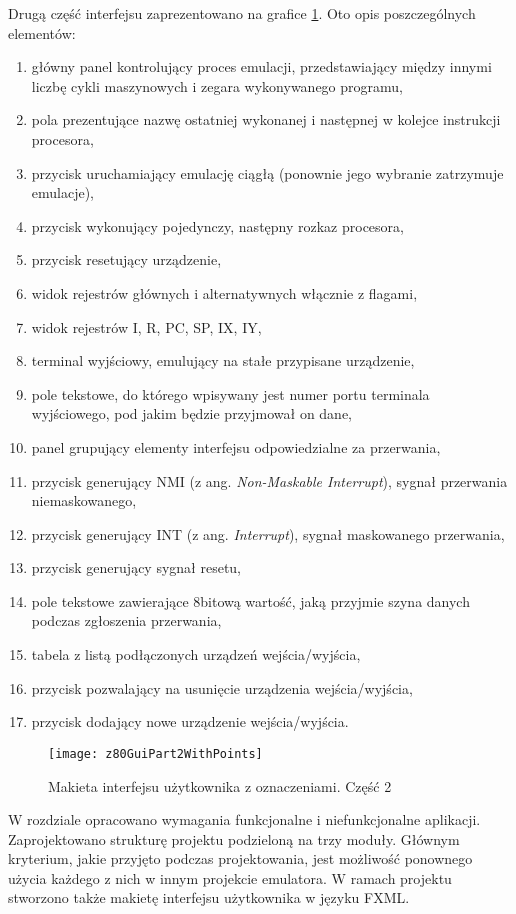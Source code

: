	Drugą część interfejsu zaprezentowano na grafice \ref{img:z80GuiPart2WithPoints}. Oto opis poszczególnych elementów:
	\begin{enumerate}
		\item główny panel kontrolujący proces emulacji, przedstawiający między innymi liczbę cykli maszynowych i zegara wykonywanego programu,
		\item pola prezentujące nazwę ostatniej wykonanej i następnej w kolejce instrukcji procesora,
		\item przycisk uruchamiający emulację ciągłą (ponownie jego wybranie zatrzymuje emulacje),
		\item przycisk wykonujący pojedynczy, następny rozkaz procesora,
		\item przycisk resetujący urządzenie,
		\item widok rejestrów głównych i alternatywnych włącznie z flagami,
		\item widok rejestrów I, R, PC, SP, IX, IY,
		\item terminal wyjściowy, emulujący na stałe przypisane urządzenie,
		\item pole tekstowe, do którego wpisywany jest numer portu terminala wyjściowego, pod jakim będzie przyjmował on dane,
		\item panel grupujący elementy interfejsu odpowiedzialne za przerwania,
		\item przycisk generujący NMI (z ang. \emph{Non-Maskable Interrupt}), sygnał przerwania niemaskowanego,
		\item przycisk generujący INT (z ang. \emph{Interrupt}), sygnał maskowanego przerwania,
		\item przycisk generujący sygnał resetu,
		\item pole tekstowe zawierające 8{\dywiz}bitową wartość, jaką przyjmie szyna danych podczas zgłoszenia przerwania,
		\item tabela z listą podłączonych urządzeń wejścia/wyjścia,
		\item przycisk pozwalający na usunięcie urządzenia wejścia/wyjścia,
		\item przycisk dodający nowe urządzenie wejścia/wyjścia.
	\end{enumerate}
	
	\begin{figure}[h]
		\centering
		\texttt{[image: z80GuiPart2WithPoints]}
		\caption{Makieta interfejsu użytkownika z oznaczeniami. Część 2}
		\label{img:z80GuiPart2WithPoints}
	\end{figure}

	
	W rozdziale opracowano wymagania funkcjonalne i niefunkcjonalne aplikacji. Zaprojektowano strukturę projektu podzieloną na trzy moduły. Głównym kryterium, jakie przyjęto podczas projektowania, jest możliwość ponownego użycia każdego z nich w innym projekcie emulatora. W ramach projektu stworzono także makietę interfejsu użytkownika w języku FXML.
